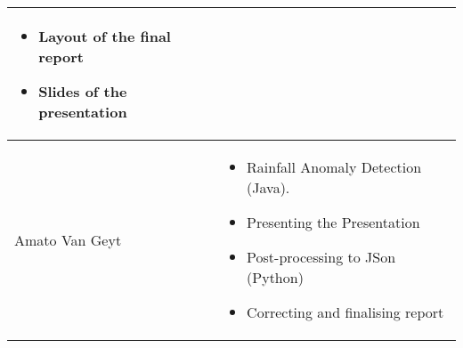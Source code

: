 \begin{longtable}{|l|p{10.5cm}|}
\begin{itemize}
	\item Layout of the final report
	\item Slides of the presentation
\end{itemize}\\
\hline
Amato Van Geyt & \begin{itemize}
	\item Rainfall Anomaly Detection (Java).
	\item Presenting the Presentation
	\item Post-processing to JSon (Python)
	\item Correcting and finalising report
\end{itemize}\\ 
\hline
\end{longtable}

